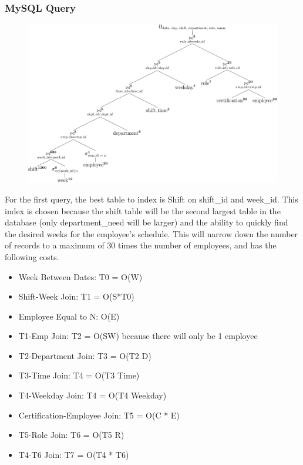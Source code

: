 \documentclass[letter,12pt]{texMemo}
\begin{document}
\subsubsection*{MySQL Query}
	
\begin{figure}[H]
	\centering
	\includegraphics[width=\textwidth]{query1.png}
\end{figure}
For the first query, the best table to index is Shift on shift\_id and week\_id. This index is chosen because the shift table will be the second largest table in the database (only department\_need will be larger) and the ability to quickly find the desired weeks for the employee's schedule. This will narrow down the number of records to a maximum of 30 times the number of employees, and has the following costs.
\begin{itemize}[noitemsep,nolistsep]
	\item Week Between Dates: T0 = O(W)
	\item Shift-Week Join: T1 = O(S*T0)
	\item Employee Equal to N: O(E)
	\item T1-Emp Join: T2 = O(SW) because there will only be 1 employee
	\item T2-Department Join: T3 = O(T2 D)
	\item T3-Time Join: T4 = O(T3 Time)
	\item T4-Weekday Join: T4 = O(T4 Weekday)
	\item Certification-Employee Join: T5 = O(C * E)
	\item T5-Role Join: T6 = O(T5 R)
	\item T4-T6 Join: T7 = O(T4 * T6)
\end{itemize}
\end{document}
